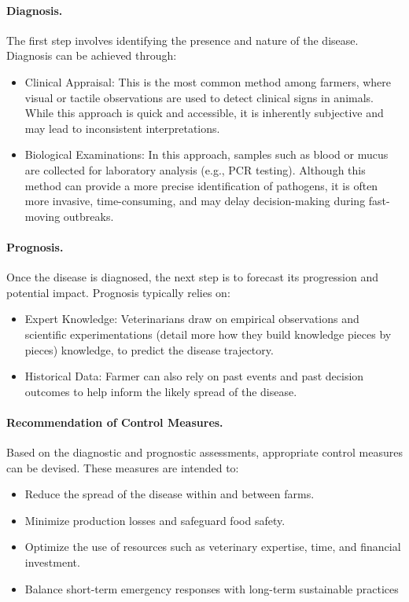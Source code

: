 \paragraph{Diagnosis.} The first step involves identifying the presence and nature of the disease. Diagnosis can be achieved through:
\begin{itemize}
    \item Clinical Appraisal: This is the most common method among farmers, where visual or tactile observations are used to detect clinical signs in animals. While this approach is quick and accessible, it is inherently subjective and may lead to inconsistent interpretations.
    \item Biological Examinations: In this approach, samples such as blood or mucus are collected for laboratory analysis (e.g., PCR testing). Although this method can provide a more precise identification of pathogens, it is often more invasive, time-consuming, and may delay decision-making during fast-moving outbreaks.
\end{itemize}

\paragraph{Prognosis.} Once the disease is diagnosed, the next step is to forecast its progression and potential impact. Prognosis typically relies on:
\begin{itemize}
    \item Expert Knowledge: Veterinarians draw on empirical observations and scientific experimentations (detail more how they build knowledge pieces by pieces) knowledge, to predict the disease trajectory.
    \item Historical Data: Farmer can also rely on past events and past decision outcomes to help inform the likely spread of the disease. 
\end{itemize}

\paragraph{Recommendation of Control Measures.} Based on the diagnostic and prognostic assessments, appropriate control measures can be devised. These measures are intended to:
\begin{itemize}
    \item Reduce the spread of the disease within and between farms.
    \item Minimize production losses and safeguard food safety.
    \item Optimize the use of resources such as veterinary expertise, time, and financial investment.
    \item Balance short-term emergency responses with long-term sustainable practices
\end{itemize}

